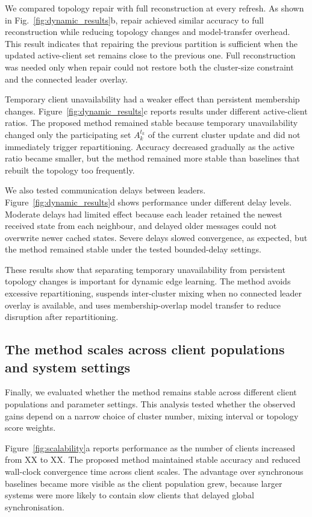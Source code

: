 \documentclass[pdflatex,sn-mathphys-num]{sn-jnl}
\begin{document}
We compared topology repair with full reconstruction at every refresh. As shown in Fig.~\ref{fig:dynamic_results}b, repair achieved similar accuracy to full reconstruction while reducing topology changes and model-transfer overhead. This result indicates that repairing the previous partition is sufficient when the updated active-client set remains close to the previous one. Full reconstruction was needed only when repair could not restore both the cluster-size constraint and the connected leader overlay.

Temporary client unavailability had a weaker effect than persistent membership changes. Figure~\ref{fig:dynamic_results}c reports results under different active-client ratios. The proposed method remained stable because temporary unavailability changed only the participating set \(A_k^{t_k}\) of the current cluster update and did not immediately trigger repartitioning. Accuracy decreased gradually as the active ratio became smaller, but the method remained more stable than baselines that rebuilt the topology too frequently.

We also tested communication delays between leaders. Figure~\ref{fig:dynamic_results}d shows performance under different delay levels. Moderate delays had limited effect because each leader retained the newest received state from each neighbour, and delayed older messages could not overwrite newer cached states. Severe delays slowed convergence, as expected, but the method remained stable under the tested bounded-delay settings.

These results show that separating temporary unavailability from persistent topology changes is important for dynamic edge learning. The method avoids excessive repartitioning, suspends inter-cluster mixing when no connected leader overlay is available, and uses membership-overlap model transfer to reduce disruption after repartitioning.

\subsection{The method scales across client populations and system settings}
\label{subsec:scalability_sensitivity_results}

Finally, we evaluated whether the method remains stable across different client populations and parameter settings. This analysis tested whether the observed gains depend on a narrow choice of cluster number, mixing interval or topology score weights.

Figure~\ref{fig:scalability}a reports performance as the number of clients increased from XX to XX. The proposed method maintained stable accuracy and reduced wall-clock convergence time across client scales. The advantage over synchronous baselines became more visible as the client population grew, because larger systems were more likely to contain slow clients that delayed global synchronisation.
\end{document}
